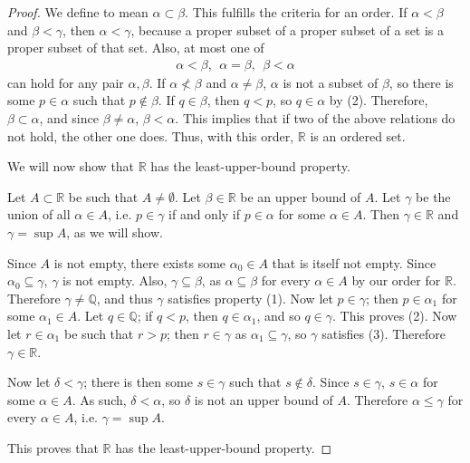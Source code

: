 \documentclass[12pt]{article}
\begin{document}
\begin{thm}
\begin{proof}
    We define \say{$\alpha < \beta$} to mean $\alpha \subset \beta$. This fulfills
    the criteria for an order. If $\alpha < \beta$ and $\beta < \gamma$, then $\alpha
    < \gamma$, because a proper subset of a proper subset of a set is a proper subset
    of that set. Also, at most one of
    \begin{align*}
      \alpha < \beta,\ \ \alpha = \beta,\ \ \beta < \alpha
    \end{align*}
    can hold for any pair $\alpha,\beta$. If $\alpha \nless \beta$ and $\alpha \neq
    \beta$, $\alpha$ is not a subset of $\beta$, so there is some $p \in \alpha$ such
    that $p \notin \beta$. If $q \in \beta$, then $q < p$, so $q \in \alpha$ by (2).
    Therefore, $\beta \subset \alpha$, and since $\beta \neq \alpha$, $\beta <
    \alpha$. This implies that if two of the above relations do not hold, the other
    one does. Thus, with this order, $\mathbb{R}$ is an ordered set.

    We will now show that $\mathbb{R}$ has the least-upper-bound property.

    Let $A \subset \mathbb{R}$ be such that $A \neq \emptyset$. Let $\beta \in
    \mathbb{R}$ be an upper bound of $A$. Let $\gamma$ be the union of all $\alpha
    \in A$, i.e. $p \in \gamma$ if and only if $p \in \alpha$ for some $\alpha \in
    A$. Then $\gamma \in \mathbb{R}$ and $\gamma = \sup A$, as we will show.

    Since $A$ is not empty, there exists some $\alpha_0 \in A$ that is itself not
    empty. Since $\alpha_0 \subseteq \gamma$, $\gamma$ is not empty. Also, $\gamma
    \subseteq \beta$, as $\alpha \subseteq \beta$ for every $\alpha \in A$ by our
    order for $\mathbb{R}$. Therefore $\gamma \neq \mathbb{Q}$, and thus $\gamma$
    satisfies property (1). Now let $p \in \gamma$; then $p \in \alpha_1$ for some
    $\alpha_1 \in A$. Let $q \in \mathbb{Q}$; if $q < p$, then $q \in \alpha_1$, and
    so $q \in \gamma$. This proves (2). Now let $r \in \alpha_1$ be such that $r >
    p$; then $r \in \gamma$ as $\alpha_1 \subseteq \gamma$, so $\gamma$ satisfies
    (3). Therefore $\gamma \in \mathbb{R}$.

    Now let $\delta < \gamma$; there is then some $s \in \gamma$ such that $s \notin
    \delta$. Since $s \in \gamma$, $s \in \alpha$ for some $\alpha \in A$. As such,
    $\delta < \alpha$, so $\delta$ is not an upper bound of $A$. Therefore $\alpha
    \leq \gamma$ for every $\alpha \in A$, i.e. $\gamma = \sup A$.

    This proves that $\mathbb{R}$ has the least-upper-bound property.


\end{proof}
\end{thm}
\end{document}
